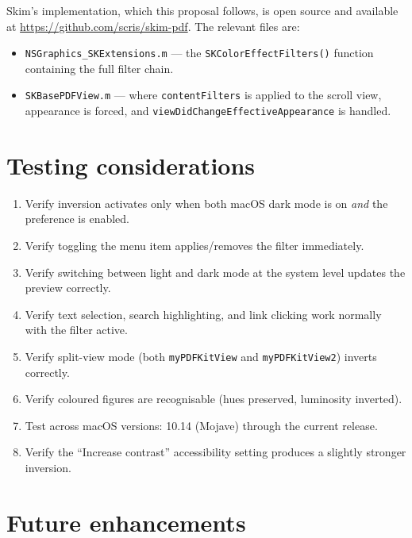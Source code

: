 \documentclass[11pt,a4paper]{article}
\begin{document}
Skim's implementation, which this proposal follows, is open source and available
at \url{https://github.com/scris/skim-pdf}. The relevant files are:

\begin{itemize}
    \item \texttt{NSGraphics\_SKExtensions.m} --- the
        \texttt{SKColorEffectFilters()} function containing the full filter
        chain.
    \item \texttt{SKBasePDFView.m} --- where \texttt{contentFilters} is applied
        to the scroll view, appearance is forced, and
        \texttt{viewDidChangeEffectiveAppearance} is handled.
\end{itemize}

\section{Testing considerations}

\begin{enumerate}
    \item Verify inversion activates only when both macOS dark mode is on
        \emph{and} the preference is enabled.
    \item Verify toggling the menu item applies/removes the filter immediately.
    \item Verify switching between light and dark mode at the system level
        updates the preview correctly.
    \item Verify text selection, search highlighting, and link clicking work
        normally with the filter active.
    \item Verify split-view mode (both \texttt{myPDFKitView} and
        \texttt{myPDFKitView2}) inverts correctly.
    \item Verify coloured figures are recognisable (hues preserved, luminosity
        inverted).
    \item Test across macOS versions: 10.14 (Mojave) through the current
        release.
    \item Verify the ``Increase contrast'' accessibility setting produces a
        slightly stronger inversion.
\end{enumerate}

\section{Future enhancements}
\end{document}
